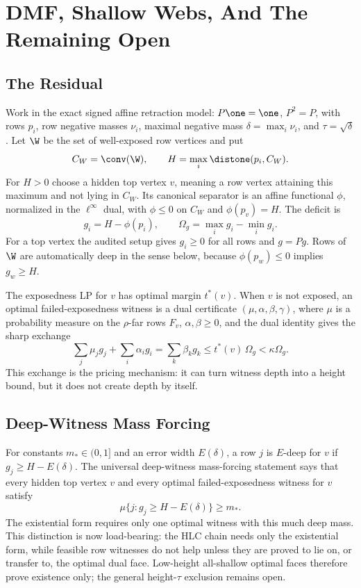 \section{DMF, Shallow Webs, And The Remaining Open}
\label{sec:residual-dmf}

\subsection{The Residual}

Work in the exact signed affine retraction model: \(P\one=\one\),
\(P^2=P\), with rows \(p_i\), row negative masses \(\nu_i\), maximal
negative mass \(\delta=\max_i\nu_i\), and \(\tau=\sqrt{\delta}\).
Let \(\W\) be the set of well-exposed row vertices and put
\[
  C_W=\conv(\W),\qquad H=\max_i\distone(p_i,C_W).
\]
For \(H>0\) choose a hidden top vertex \(v\), meaning a row vertex attaining
this maximum and not lying in \(C_W\).  Its canonical separator is an affine
functional \(\phi\), normalized in the \(\ell^\infty\) dual, with
\(\phi\le0\) on \(C_W\) and \(\phi(p_v)=H\).  The deficit is
\[
  g_i=H-\phi(p_i),\qquad \Omega_g=\max_i g_i-\min_i g_i .
\]
For a top vertex the audited setup gives \(g_i\ge0\) for all rows and
\(g=Pg\).  Rows of \(\W\) are automatically deep in the sense below, because
\(\phi(p_w)\le0\) implies \(g_w\ge H\).

The exposedness LP for \(v\) has optimal margin \(t^*(v)\).  When \(v\) is
not exposed, an optimal failed-exposedness witness is a dual certificate
\((\mu,\alpha,\beta,\gamma)\), where \(\mu\) is a probability measure on the
\(\rho\)-far rows \(F_v\), \(\alpha,\beta\ge0\), and the dual identity gives
the sharp exchange
\[
  \sum_j\mu_j g_j+\sum_i\alpha_i g_i
  =\sum_k\beta_k g_k
  \le t^*(v)\,\Omega_g<\kappa\Omega_g .
\]
This exchange is the pricing mechanism: it can turn witness depth into a
height bound, but it does not create depth by itself.

\subsection{Deep-Witness Mass Forcing}

For constants \(m_*\in(0,1]\) and an error width \(E(\delta)\), a row
\(j\) is \(E\)-deep for \(v\) if \(g_j\ge H-E(\delta)\).  The universal
deep-witness mass-forcing statement says that every hidden top vertex \(v\)
and every optimal failed-exposedness witness for \(v\) satisfy
\[
  \mu\{j:g_j\ge H-E(\delta)\}\ge m_* .
\]
The existential form requires only one optimal witness with this much deep
mass.  This distinction is now load-bearing: the HLC chain needs only the
existential form, while feasible row witnesses do not help unless they are
proved to lie on, or transfer to, the optimal dual face.  Low-height
all-shallow optimal faces therefore prove existence only; the general
height-\(\tau\) exclusion remains open.

